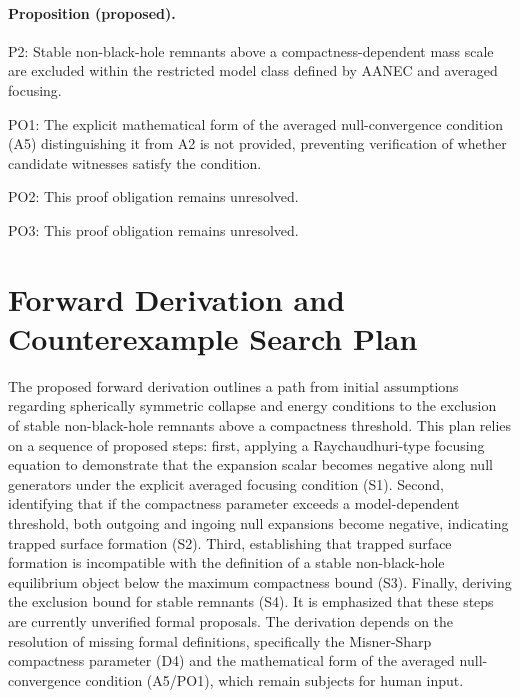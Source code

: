 \documentclass[conference]{IEEEtran}
\begin{document}
\paragraph{Proposition (proposed).} P2: Stable non-black-hole remnants above a compactness-dependent mass scale are excluded within the restricted model class defined by AANEC and averaged focusing.

PO1: The explicit mathematical form of the averaged null-convergence condition (A5) distinguishing it from A2 is not provided, preventing verification of whether candidate witnesses satisfy the condition.

PO2: This proof obligation remains unresolved.

PO3: This proof obligation remains unresolved.

\section{Forward Derivation and Counterexample Search Plan}
The proposed forward derivation outlines a path from initial assumptions regarding spherically symmetric collapse and energy conditions to the exclusion of stable non-black-hole remnants above a compactness threshold. This plan relies on a sequence of proposed steps: first, applying a Raychaudhuri-type focusing equation to demonstrate that the expansion scalar becomes negative along null generators under the explicit averaged focusing condition (S1). Second, identifying that if the compactness parameter exceeds a model-dependent threshold, both outgoing and ingoing null expansions become negative, indicating trapped surface formation (S2). Third, establishing that trapped surface formation is incompatible with the definition of a stable non-black-hole equilibrium object below the maximum compactness bound (S3). Finally, deriving the exclusion bound for stable remnants (S4). It is emphasized that these steps are currently unverified formal proposals. The derivation depends on the resolution of missing formal definitions, specifically the Misner-Sharp compactness parameter (D4) and the mathematical form of the averaged null-convergence condition (A5/PO1), which remain subjects for human input.
\end{document}
